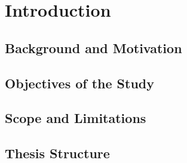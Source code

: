 
\chapter{Introduction}\label{chapter:introduction}

\section{Background and Motivation}\label{background:backgroundAndMotivation}
\section{Objectives of the Study}\label{objective:objectives}
\section{Scope and Limitations}\label{scope:scope}
\section{Thesis Structure}\label{thesis:thesis}
